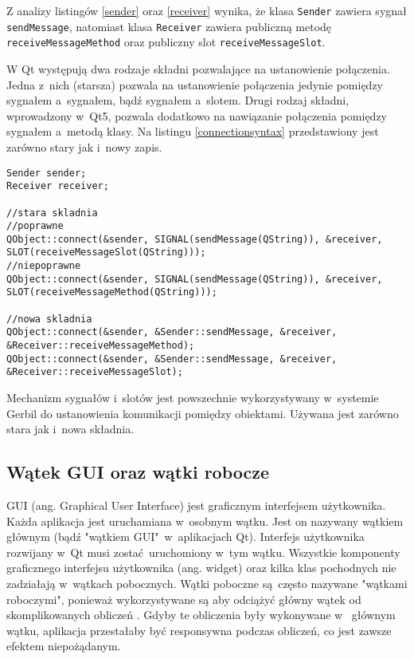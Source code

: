 Z analizy listingów \ref{sender} oraz \ref{receiver} wynika, że klasa \lstinline{Sender} zawiera sygnał \lstinline{sendMessage}, natomiast klasa \lstinline{Receiver} zawiera publiczną metodę \lstinline{receiveMessageMethod} oraz publiczny slot \lstinline{receiveMessageSlot}.

W Qt występują dwa rodzaje składni pozwalające na ustanowienie połączenia. Jedna z~nich (starsza) pozwala na ustanowienie połączenia jedynie pomiędzy sygnałem a~sygnałem, bądź sygnałem a~slotem. Drugi rodzaj składni, wprowadzony w~Qt5, pozwala dodatkowo na nawiązanie połączenia pomiędzy sygnałem a~metodą klasy. Na listingu \ref{connectionsyntax} przedstawiony jest zarówno stary jak i~nowy zapis.

\begin{minipage}{\textwidth}
	\begin{lstlisting}[label=connectionsyntax, caption={Składnia tworzenia połączeń między obiektami.},alsoletter={()[].=}]
Sender sender;
Receiver receiver;

//stara skladnia
//poprawne
QObject::connect(&sender, SIGNAL(sendMessage(QString)), &receiver, SLOT(receiveMessageSlot(QString)));
//niepoprawne
QObject::connect(&sender, SIGNAL(sendMessage(QString)), &receiver, SLOT(receiveMessageMethod(QString)));

//nowa skladnia
QObject::connect(&sender, &Sender::sendMessage, &receiver, &Receiver::receiveMessageMethod);
QObject::connect(&sender, &Sender::sendMessage, &receiver, &Receiver::receiveMessageSlot);
	\end{lstlisting}
\end{minipage}

Mechanizm sygnałów i~slotów jest powszechnie wykorzystywany w~systemie Gerbil do ustanowienia komunikacji pomiędzy obiektami. Używana jest zarówno stara jak i~nowa składnia.

\subsection{Wątek GUI oraz wątki robocze}
GUI (ang. Graphical User Interface) jest graficznym interfejsem użytkownika. Każda aplikacja jest uruchamiana w~osobnym wątku. Jest on nazywany wątkiem głównym (bądź "wątkiem GUI"~w~aplikacjach Qt). Interfejs użytkownika rozwijany w~Qt musi zostać uruchomiony w~tym wątku. Wszystkie komponenty graficznego interfejsu użytkownika (ang. widget) oraz kilka klas pochodnych nie zadziałają w~wątkach pobocznych. Wątki poboczne są często nazywane "wątkami roboczymi", ponieważ wykorzystywane są aby odciążyć główny wątek od skomplikowanych obliczeń \cite{Qtdoc}. Gdyby te obliczenia były wykonywane w~ głównym wątku, aplikacja przestałaby być responsywna podczas obliczeń, co jest zawsze efektem niepożądanym.


